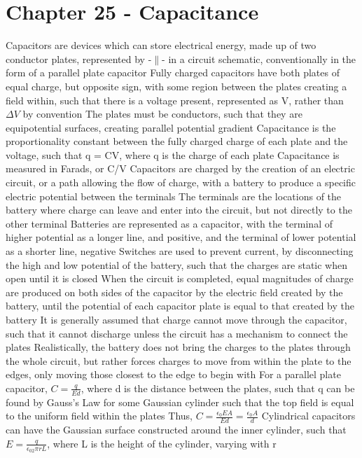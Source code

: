 \documentclass[11 pt, twoside]{article}
\newenvironment{outline*}
{
	\begin{outline}[enumerate]
	}
	{\end{outline}
}
\begin{document}
\section{Chapter 25 - Capacitance}
\begin{outline*}
\1 Capacitors are devices which can store electrical energy, made up of two conductor plates, represented by -$\|$- in a circuit schematic, conventionally in the form of a parallel plate capacitor
\2 Fully charged capacitors have both plates of equal charge, but opposite sign, with some region between the plates creating a field within, such that there is a voltage present, represented as V, rather than $\Delta V$ by convention
\3 The plates must be conductors, such that they are equipotential surfaces, creating parallel potential gradient
\2 Capacitance is the proportionality constant between the fully charged charge of each plate and the voltage, such that q = CV, where q is the charge of each plate
\3 Capacitance is measured in Farads, or C/V
\1 Capacitors are charged by the creation of an electric circuit, or a path allowing the flow of charge, with a battery to produce a specific electric potential between the terminals
\2 The terminals are the locations of the battery where charge can leave and enter into the circuit, but not directly to the other terminal
\2 Batteries are represented as a capacitor, with the terminal of higher potential as a longer line, and positive, and the terminal of lower potential as a shorter line, negative
\2 Switches are used to prevent current, by disconnecting the high and low potential of the battery, such that the charges are static when open until it is closed
\2 When the circuit is completed, equal magnitudes of charge are produced on both sides of the capacitor by the electric field created by the battery, until the potential of each capacitor plate is equal to that created by the battery
\3 It is generally assumed that charge cannot move through the capacitor, such that it cannot discharge unless the circuit has a mechanism to connect the plates
\3 Realistically, the battery does not bring the charges to the plates through the whole circuit, but rather forces charges to move from within the plate to the edges, only moving those closest to the edge to begin with
\1 For a parallel plate capacitor, $C = \frac{q}{Ed}$, where d is the distance between the plates, such that q can be found by Gauss's Law for some Gaussian cylinder such that the top field is equal to the uniform field within the plates
\2 Thus, $C = \frac{\epsilon_0EA}{Ed} = \frac{\epsilon_0A}{d}$
\2 Cylindrical capacitors can have the Gaussian surface constructed around the inner cylinder, such that $E = \frac{q}{\epsilon_02\pi rL}$, where L is the height of the cylinder, varying with r

\end{outline*}
\end{document}
